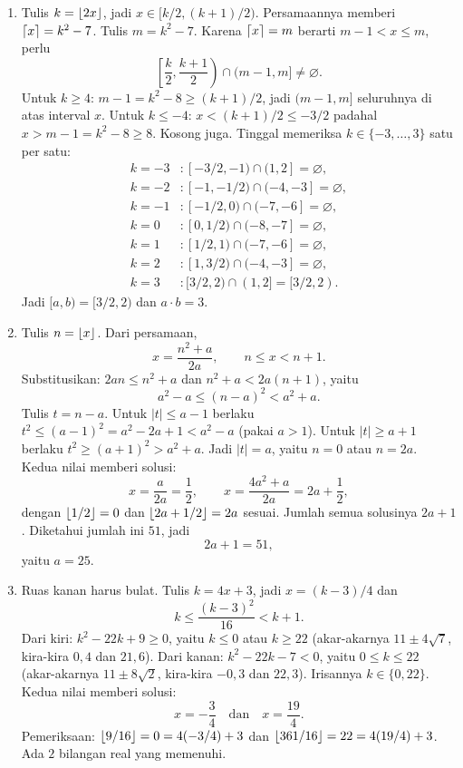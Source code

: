 \documentclass[12pt]{scrartcl}
\begin{document}
\begin{enumerate}[resume]
	\item Tulis $k = \left\lfloor 2x \right\rfloor$, jadi $x \in [k/2, (k+1)/2)$.
	Persamaannya memberi $\left\lceil x \right\rceil = k^2 - 7$.
	Tulis $m = k^2 - 7$. Karena $\left\lceil x \right\rceil = m$ berarti
	$m - 1 < x \le m$, perlu
	\[ \left[\frac{k}{2}, \frac{k+1}{2}\right) \cap (m-1, m]
	\ne \varnothing. \]
	Untuk $k \ge 4$: $m - 1 = k^2 - 8 \ge (k+1)/2$,
	jadi $(m-1, m]$ seluruhnya di atas interval $x$.
	Untuk $k \le -4$: $x < (k+1)/2 \le -3/2$
	padahal $x > m - 1 = k^2 - 8 \ge 8$. Kosong juga.
	Tinggal memeriksa $k \in \{-3, \dots, 3\}$ satu per satu:
	\begin{align*}
	k = -3 &: [-3/2, -1) \cap (1, 2] = \varnothing, \\
	k = -2 &: [-1, -1/2) \cap (-4, -3] = \varnothing, \\
	k = -1 &: [-1/2, 0) \cap (-7, -6] = \varnothing, \\
	k = 0 &: [0, 1/2) \cap (-8, -7] = \varnothing, \\
	k = 1 &: [1/2, 1) \cap (-7, -6] = \varnothing, \\
	k = 2 &: [1, 3/2) \cap (-4, -3] = \varnothing, \\
	k = 3 &: [3/2, 2) \cap (1, 2] = [3/2, 2).
	\end{align*}
	Jadi $[a, b) = [3/2, 2)$ dan $a \cdot b = 3$.

	\item Tulis $n = \left\lfloor x \right\rfloor$. Dari persamaan,
	\[ x = \frac{n^2 + a}{2a}, \qquad n \le x < n + 1. \]
	Substitusikan: $2an \le n^2 + a$ dan $n^2 + a < 2a(n+1)$, yaitu
	\[ a^2 - a \le (n-a)^2 < a^2 + a. \]
	Tulis $t = n - a$.
	Untuk $|t| \le a - 1$ berlaku $t^2 \le (a-1)^2 = a^2 - 2a + 1 < a^2 - a$
	(pakai $a > 1$).
	Untuk $|t| \ge a + 1$ berlaku $t^2 \ge (a+1)^2 > a^2 + a$.
	Jadi $|t| = a$, yaitu $n = 0$ atau $n = 2a$.
	Kedua nilai memberi solusi:
	\[ x = \frac{a}{2a} = \frac{1}{2},
	\qquad
	x = \frac{4a^2 + a}{2a} = 2a + \frac{1}{2}, \]
	dengan $\left\lfloor 1/2 \right\rfloor = 0$ dan $\left\lfloor 2a+1/2 \right\rfloor = 2a$ sesuai.
	Jumlah semua solusinya $2a + 1$.
	Diketahui jumlah ini $51$, jadi
	\[ 2a + 1 = 51, \]
	yaitu $a = 25$.

	\item Ruas kanan harus bulat.
	Tulis $k = 4x + 3$, jadi $x = (k-3)/4$ dan
	\[ k \le \frac{(k-3)^2}{16} < k + 1. \]
	Dari kiri: $k^2 - 22k + 9 \ge 0$,
	yaitu $k \le 0$ atau $k \ge 22$
	(akar-akarnya $11 \pm 4\sqrt{7}$, kira-kira $0{,}4$ dan $21{,}6$).
	Dari kanan: $k^2 - 22k - 7 < 0$,
	yaitu $0 \le k \le 22$
	(akar-akarnya $11 \pm 8\sqrt{2}$, kira-kira $-0{,}3$ dan $22{,}3$).
	Irisannya $k \in \{0, 22\}$. Kedua nilai memberi solusi:
	\[ x = -\frac{3}{4} \quad\text{dan}\quad x = \frac{19}{4}. \]
	Pemeriksaan: $\left\lfloor 9/16 \right\rfloor = 0 = 4(-3/4) + 3$
	dan $\left\lfloor 361/16 \right\rfloor = 22 = 4(19/4) + 3$.
	Ada $2$ bilangan real yang memenuhi.


\end{enumerate}
\end{document}
